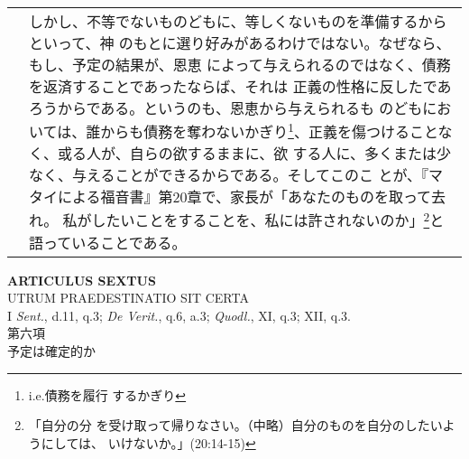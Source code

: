 \documentclass[10pt]{jsarticle} %
\begin{document}
\begin{longtable}{p{21em}p{21em}}
&

しかし、不等でないものどもに、等しくないものを準備するからといって、神
のもとに選り好みがあるわけではない。なぜなら、もし、予定の結果が、恩恵
によって与えられるのではなく、債務を返済することであったならば、それは
正義の性格に反したであろうからである。というのも、恩恵から与えられるも
のどもにおいては、誰からも債務を奪わないかぎり\footnote{i.e.債務を履行
するかぎり}、正義を傷つけることなく、或る人が、自らの欲するままに、欲
する人に、多くまたは少なく、与えることができるからである。そしてこのこ
とが、『マタイによる福音書』第20章で、家長が「あなたのものを取って去れ。
私がしたいことをすることを、私には許されないのか」\footnote{「自分の分
を受け取って帰りなさい。（中略）自分のものを自分のしたいようにしては、
いけないか。」(20:14-15)}と語っていることである。




\end{longtable}
\newpage







\begin{center}
 {\Large {\bf ARTICULUS SEXTUS}}\\
 {\large UTRUM PRAEDESTINATIO SIT CERTA}\\
 {\footnotesize I {\itshape Sent.}, d.11, q.3; {\itshape De Verit.},
 q.6, a.3; {\itshape Quodl.}, XI, q.3; XII, q.3.}\\
 {\Large 第六項\\予定は確定的か}
\end{center}
\end{document}
